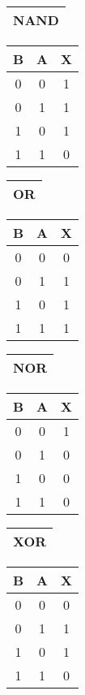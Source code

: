 \documentclass[12pt, letterpaper, titlepage]{article}
\begin{document}
\begin{center}
\begin{tabular}{ |c| }
\hline
NAND \\
\hline
\end{tabular}
\end{center}
\begin{center}
\begin{tabular}{ |c|c|c| }
\hline
B & A & X \\
\hline
0 & 0 & 1 \\
0 & 1 & 1 \\
1 & 0 & 1 \\
1 & 1 & 0 \\
\hline
\end{tabular}
\end{center}
\begin{center}
\begin{tabular}{ |c| }
\hline
OR \\
\hline
\end{tabular}
\end{center}
\begin{center}
\begin{tabular}{ |c|c|c| }
\hline
B & A & X \\
\hline
0 & 0 & 0 \\
0 & 1 & 1 \\
1 & 0 & 1 \\
1 & 1 & 1 \\
\hline
\end{tabular}
\end{center}
\begin{center}
\begin{tabular}{ |c| }
\hline
NOR \\
\hline
\end{tabular}
\end{center}
\begin{center}
\begin{tabular}{ |c|c|c| }
\hline
B & A & X \\
\hline
0 & 0 & 1 \\
0 & 1 & 0 \\
1 & 0 & 0 \\
1 & 1 & 0 \\
\hline
\end{tabular}
\end{center}
\begin{center}
\begin{tabular}{ |c| }
\hline
XOR \\
\hline
\end{tabular}
\end{center}
\begin{center}
\begin{tabular}{ |c|c|c| }
\hline
B & A & X \\
\hline
0 & 0 & 0 \\
0 & 1 & 1 \\
1 & 0 & 1 \\
1 & 1 & 0 \\
\hline
\end{tabular}
\end{center}
\end{document}
